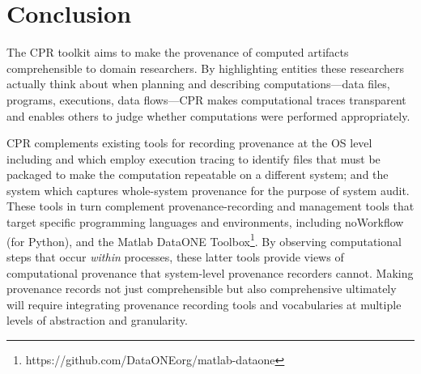 \section{Conclusion}

The CPR toolkit aims to make the provenance of computed artifacts comprehensible to domain researchers. By highlighting entities these researchers actually think about when planning and describing computations---data files, programs, executions, data flows---CPR makes computational traces transparent and enables others to judge whether computations were performed appropriately.

CPR complements existing tools for recording provenance at the OS level including  and \cite{that_sciunits_2017} which employ execution tracing to identify files that must be packaged to make the computation repeatable on a different system; and the \cite{pasquier-socc2017} system which captures whole-system provenance for the purpose of system audit. These tools in turn complement provenance-recording and management tools that target specific programming languages and environments, including noWorkflow \cite{pimentel_fine-grained_2016} (for Python), and the Matlab DataONE Toolbox\footnote{https://github.com/DataONEorg/matlab-dataone}. By observing computational steps that occur \emph{within} processes, these latter tools provide views of computational provenance that system-level provenance recorders cannot.  Making provenance records not just comprehensible but also comprehensive ultimately will require integrating provenance recording tools and vocabularies at multiple levels of abstraction and granularity.